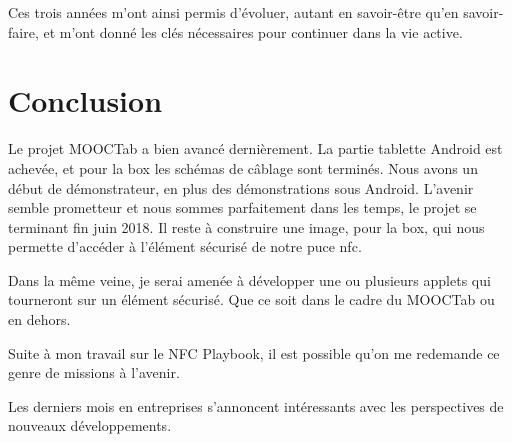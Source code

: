 \documentclass[french,12pt,a4paper,titlepage,openright,openbib]{report}
\begin{document}
Ces trois années m'ont ainsi permis d'évoluer, autant en savoir-être qu'en savoir-faire, et m'ont donné les clés nécessaires pour continuer dans la vie active.

\chapter{Conclusion}
Le projet MOOCTab a bien avancé dernièrement.
La partie tablette Android est achevée, et pour la box les schémas de câblage sont terminés. Nous avons un début de démonstrateur, en plus des démonstrations sous Android.
L'avenir semble prometteur et nous sommes parfaitement dans les temps, le projet se terminant fin juin 2018.
Il reste à construire une image, pour la box, qui nous permette d'accéder à l'élément sécurisé de notre puce \gls{nfc}.

Dans la même veine, je serai amenée à développer une ou plusieurs applets qui tourneront sur un élément sécurisé. Que ce soit dans le cadre du MOOCTab ou en dehors.

Suite à mon travail sur le NFC Playbook, il est possible qu'on me redemande ce genre de missions à l'avenir.

Les derniers mois en entreprises s'annoncent intéressants avec les perspectives de nouveaux développements.

\printglossary[title={Glossaire}]

{}

	
\end{document}
